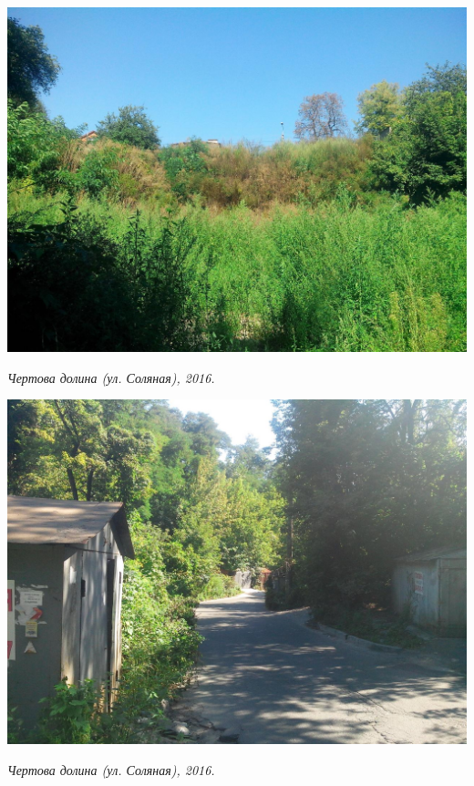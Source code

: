 \begin{center}
\includegraphics[width=0.95\linewidth]{rpix/IMG_20160828_145726.jpg}

\textit{Чертова долина (ул. Соляная), 2016.}
\end{center}

\begin{center}
\includegraphics[width=\linewidth]{rpix/IMG_20160828_145732.jpg}

\textit{Чертова долина (ул. Соляная), 2016.}
\end{center}



